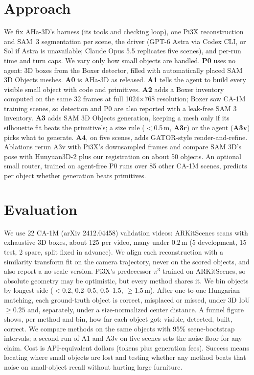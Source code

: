 \documentclass[11pt]{article}
\begin{document}
\section*{Approach}
We fix AHa-3D's harness (its tools and checking loop), one Pi3X reconstruction and SAM~3 segmentation per scene, the driver (GPT-6 Astra via Codex CLI, or Sol if Astra is unavailable; Claude Opus 5.5 replicates five scenes), and per-run time and turn caps. We vary only how small objects are handled. \textbf{P0} uses no agent: 3D boxes from the Boxer detector, filled with automatically placed SAM 3D Objects meshes. \textbf{A0} is AHa-3D as released. \textbf{A1} tells the agent to build every visible small object with code and primitives. \textbf{A2} adds a Boxer inventory computed on the same 32 frames at full 1024$\times$768 resolution; Boxer saw CA-1M training scenes, so detection and P0 are also reported with a leak-free SAM 3 inventory. \textbf{A3} adds SAM 3D Objects generation, keeping a mesh only if its silhouette fit beats the primitive's; a size rule ($<$0.5\,m, \textbf{A3r}) or the agent (\textbf{A3v}) picks what to generate. \textbf{A4}, on five scenes, adds GATOR-style render-and-refine. Ablations rerun A3v with Pi3X's downsampled frames and compare SAM 3D's pose with \mbox{Hunyuan3D-2} plus our registration on about 50 objects. An optional small router, trained on agent-free P0 runs over 85 other CA-1M scenes, predicts per object whether generation beats primitives.

\section*{Evaluation}
We use 22 CA-1M (arXiv 2412.04458) validation videos: ARKitScenes scans with exhaustive 3D boxes, about 125 per video, many under 0.2\,m (5 development, 15 test, 2 spare, split fixed in advance). We align each reconstruction with a similarity transform fit on the camera trajectory, never on the scored objects, and also report a no-scale version. Pi3X's predecessor $\pi^3$ trained on ARKitScenes, so absolute geometry may be optimistic, but every method shares it. We bin objects by longest side ($<$0.2, 0.2--0.5, 0.5--1.5, $\geq$1.5\,m). After one-to-one Hungarian matching, each ground-truth object is correct, misplaced or missed, under 3D IoU $\geq 0.25$ and, separately, under a size-normalized center distance. A funnel figure shows, per method and bin, how far each object got: visible, detected, built, correct. We compare methods on the same objects with 95\% scene-bootstrap intervals; a second run of A1 and A3v on five scenes sets the noise floor for any claim. Cost is API-equivalent dollars (tokens plus generation fees). Success means locating where small objects are lost and testing whether any method beats that noise on small-object recall without hurting large furniture.
\end{document}
